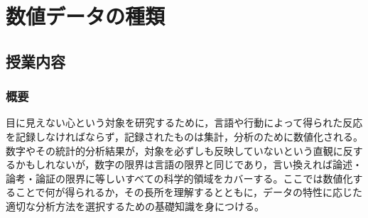 \section{数値データの種類}
\label{b02_Number_and_data}

\subsection{授業内容}
\subsubsection{概要}
目に見えない心という対象を研究するために，言語や行動によって得られた反応を記録しなければならず，記録されたものは集計，分析のために数値化される。数字やその統計的分析結果が，対象を必ずしも反映していないという直観に反するかもしれないが，数字の限界は言語の限界と同じであり，言い換えれば論述・論考・論証の限界に等しいすべての科学的領域をカバーする。ここでは数値化することで何が得られるか，その長所を理解するとともに，データの特性に応じた適切な分析方法を選択するための基礎知識を身につける。
